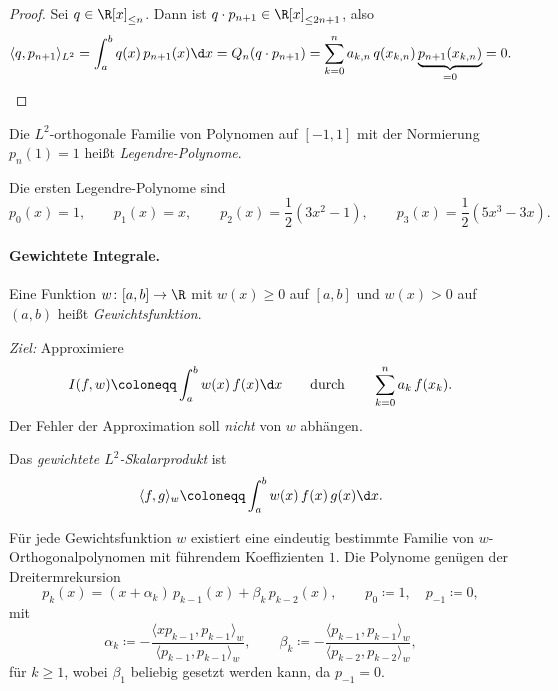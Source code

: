 \documentclass[11pt]{article}
\begin{document}
\begin{proof}
  Sei $q \in \R[x]_{\le n}$. Dann ist $q \cdot p_{n+1} \in \R[x]_{\le 2n+1}$, also
  \[ \langle q, p_{n+1} \rangle_{L^2} = \int_a^b q(x)\, p_{n+1}(x) \d x = Q_n(q \cdot p_{n+1}) = \sum_{k=0}^{n} a_{k,n}\, q(x_{k,n}) \underbrace{p_{n+1}(x_{k,n})}_{= 0} = 0. \qedhere \]
\end{proof}

\begin{definition}\Theorem
  Die $L^2$-orthogonale Familie von Polynomen auf $[-1, 1]$ mit der Normierung $p_n(1) = 1$ heißt \emph{Legendre-Polynome}.
\end{definition}

\begin{example}
  Die ersten Legendre-Polynome sind
  \[ p_0(x) = 1, \qquad p_1(x) = x, \qquad p_2(x) = \frac{1}{2}(3x^2 - 1), \qquad p_3(x) = \frac{1}{2}(5x^3 - 3x). \]
\end{example}




\paragraph{Gewichtete Integrale.}
\begin{definition}[Gewichtsfunktion]\Theorem
  Eine Funktion $w \colon [a, b] \to \R$ mit $w(x) \ge 0$ auf $[a, b]$ und $w(x) > 0$ auf $(a, b)$ heißt \emph{Gewichtsfunktion}.
\end{definition}

\textit{Ziel:} Approximiere
\[ I(f, w) \coloneqq \int_a^b w(x)\, f(x) \d x \qquad \text{durch} \qquad \sum_{k=0}^{n} a_k\, f(x_k). \]
Der Fehler der Approximation soll \textit{nicht} von $w$ abhängen.

\begin{definition}\Theorem
  Das \emph{gewichtete $L^2$-Skalarprodukt} ist
  \[ \langle f, g \rangle_w \coloneqq \int_a^b w(x)\, f(x)\, g(x) \d x. \]
\end{definition}

\begin{theorem}\Theorem
  Für jede Gewichtsfunktion $w$ existiert eine eindeutig bestimmte Familie von $w$-Orthogonalpolynomen mit führendem Koeffizienten $1$. Die Polynome genügen der Dreitermrekursion
  \[ p_k(x) = (x + \alpha_k)\, p_{k-1}(x) + \beta_k\, p_{k-2}(x), \qquad p_0 \coloneqq 1, \quad p_{-1} \coloneqq 0, \]
  mit
  \[ \alpha_k \coloneqq - \frac{\langle x p_{k-1}, p_{k-1} \rangle_w}{\langle p_{k-1}, p_{k-1} \rangle_w}, \qquad \beta_k \coloneqq - \frac{\langle p_{k-1}, p_{k-1} \rangle_w}{\langle p_{k-2}, p_{k-2} \rangle_w}, \]
  für $k \ge 1$, wobei $\beta_1$ beliebig gesetzt werden kann, da $p_{-1} = 0$.
\end{theorem}
\end{document}
